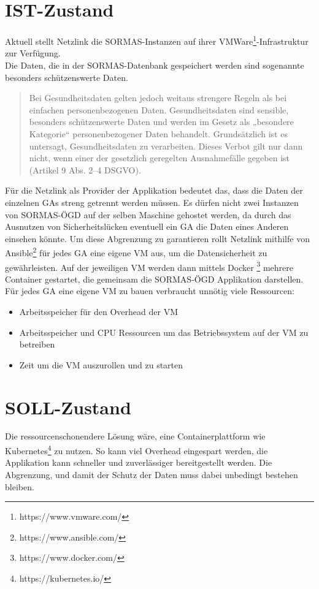 \section{IST-Zustand}
Aktuell stellt Netzlink die \ac{SORMAS}-Instanzen auf ihrer VMWare\footnote{https://www.vmware.com/}-Infrastruktur zur Verfügung. 
\\
Die Daten, die in der \ac{SORMAS}-Datenbank gespeichert werden sind sogenannte besonders schützenswerte Daten.
\begin{quote}
    Bei Gesundheitsdaten gelten jedoch weitaus strengere Regeln als bei einfachen personenbezogenen Daten. 
    Gesundheitsdaten sind sensible, besonders schützenswerte Daten und werden im Gesetz als „besondere Kategorie“ personenbezogener Daten behandelt. 
    Grundsätzlich ist es untersagt, Gesundheitsdaten zu verarbeiten. 
    Dieses Verbot gilt nur dann nicht, wenn einer der gesetzlich geregelten Ausnahmefälle gegeben ist (Artikel 9 Abs. 2–4 \ac{DSGVO}). 
    \cite{Gesundheitsdatenschutz}
\end{quote}
Für die Netzlink als Provider der Applikation bedeutet das, dass die Daten der einzelnen \ac{GAs} streng getrennt werden müssen. 
Es dürfen nicht zwei Instanzen von \ac{SORMAS-ÖGD} auf der selben Maschine gehostet werden, da durch das Ausnutzen von Sicherheitslücken eventuell ein \ac{GA} die Daten eines Anderen einsehen könnte.
Um diese Abgrenzung zu garantieren rollt Netzlink mithilfe von Ansible\footnote{https://www.ansible.com/} für jedes \ac{GA} eine eigene \ac{VM} aus, um die Datensicherheit zu gewährleisten.
Auf der jeweiligen \ac{VM} werden dann mittels Docker \footnote{https://www.docker.com/} mehrere Container gestartet, die gemeinsam die \ac{SORMAS-ÖGD} Applikation darstellen.
\\
Für jedes \ac{GA} eine eigene VM zu bauen verbraucht unnötig viele Ressourcen:
\begin{itemize}
    \item Arbeitsspeicher für den Overhead der \ac{VM}
    \item Arbeitsspeicher und CPU Ressourcen um das Betriebssystem auf der \ac{VM} zu betreiben
    \item Zeit um die \ac{VM} auszurollen und zu starten 
\end{itemize}

\section{SOLL-Zustand}
Die ressourcenschonendere Lösung wäre, eine Containerplattform wie Kubernetes\footnote{https://kubernetes.io/} zu nutzen.
So kann viel Overhead eingespart werden, die Applikation kann schneller und zuverlässiger bereitgestellt werden. 
Die Abgrenzung, und damit der Schutz der Daten muss dabei unbedingt bestehen bleiben.

